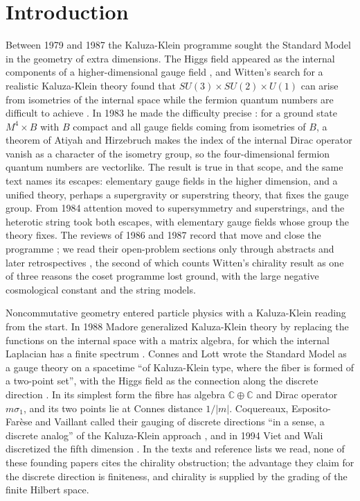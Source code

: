 \documentclass[aps,prd,reprint,onecolumn,nofootinbib,amsmath,amssymb,floatfix]{revtex4-2}
\theoremstyle{plain}
\newcommand{\C}{\mathbb C}
\begin{document}
\section{Introduction}

Between 1979 and 1987 the Kaluza-Klein programme sought the Standard Model in the geometry of extra dimensions. The Higgs field appeared as the internal components of a higher-dimensional gauge field \cite{Manton1979,Fairlie1979,ForgacsManton1980,ChaplineManton1981}, and Witten's search for a realistic Kaluza-Klein theory found that $SU(3)\times SU(2)\times U(1)$ can arise from isometries of the internal space while the fermion quantum numbers are difficult to achieve \cite{Witten1981}. In 1983 he made the difficulty precise \cite{Witten1983}: for a ground state $M^4\times B$ with $B$ compact and all gauge fields coming from isometries of $B$, a theorem of Atiyah and Hirzebruch makes the index of the internal Dirac operator vanish as a character of the isometry group, so the four-dimensional fermion quantum numbers are vectorlike. The result is true in that scope, and the same text names its escapes: elementary gauge fields in the higher dimension, and a unified theory, perhaps a supergravity or superstring theory, that fixes the gauge group. From 1984 attention moved to supersymmetry and superstrings, and the heterotic string took both escapes, with elementary gauge fields whose group the theory fixes. The reviews of 1986 and 1987 record that move and close the programme \cite{DNP1986,BailinLove1987}; we read their open-problem sections only through abstracts and later retrospectives \cite{Duff1994,DNP2025}, the second of which counts Witten's chirality result as one of three reasons the coset programme lost ground, with the large negative cosmological constant and the string models.

Noncommutative geometry entered particle physics with a Kaluza-Klein reading from the start. In 1988 Madore generalized Kaluza-Klein theory by replacing the functions on the internal space with a matrix algebra, for which the internal Laplacian has a finite spectrum \cite{Madore1989}. Connes and Lott wrote the Standard Model as a gauge theory on a spacetime ``of Kaluza-Klein type, where the fiber is formed of a two-point set'', with the Higgs field as the connection along the discrete direction \cite{ConnesLott1991}. In its simplest form the fibre has algebra $\C\oplus\C$ and Dirac operator $m\sigma_1$, and its two points lie at Connes distance $1/|m|$. Coquereaux, Esposito-Far\`ese and Vaillant called their gauging of discrete directions ``in a sense, a discrete analog'' of the Kaluza-Klein approach \cite{CEFV1991}, and in 1994 Viet and Wali discretized the fifth dimension \cite{VW1996}. In the texts and reference lists we read, none of these founding papers cites the chirality obstruction; the advantage they claim for the discrete direction is finiteness, and chirality is supplied by the grading of the finite Hilbert space.
\end{document}
